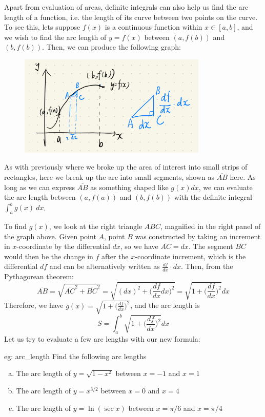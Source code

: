 Apart from evaluation of areas, definite integrals can also help us find the arc length of a function, i.e. the length of its curve between two points on the curve.  To see this, lets suppose $f(x)$ is a continuous function within $x \in [a, b]$, and we wish to find the arc length of $y = f(x)$ between $(a,f(b))$ and $(b, f(b))$.  Then, we can produce the following graph:

\begin{figure}[ht]
    \centering
    \includegraphics[width = 0.8\textwidth]{figures/chap 07/arc_length.png}
\end{figure}

As with previously where we broke up the area of interest into small strips of rectangles, here we break up the arc into small segments, shown as $\overline{AB}$ here.  As long as we can express $\overline{AB}$ as something shaped like $g(x)dx$, we can evaluate the arc length between $(a, f(a))$ and $(b, f(b))$ with the definite integral $\int_a^b g(x)~dx$.  

To find $g(x)$, we look at the right triangle $ABC$, magnified in the right panel of the graph above.  Given point $A$, point $B$ was constructed by taking an increment in $x$-coordinate by the differential $dx$, so we have $\overline{AC} = dx$.  The segment $\overline{BC}$ would then be the change in $f$ after the $x$-coordinate increment, which is the differential $df$ and can be alternatively written as $\frac{df}{dx}\cdot dx$.  Then, from the Pythagorean theorem:
\[\overline{AB} = \sqrt{\overline{AC}^2+\overline{BC}^2} = \sqrt{(dx)^2 + \Big(\frac{df}{dx}dx\Big)^2} = \sqrt{1 + \Big(\frac{df}{dx}\Big)^2}dx\]
Therefore, we have $g(x) = \sqrt{1 + \Big(\frac{df}{dx}\Big)^2}$, and the arc length is
\[S = \int_a^b \sqrt{1 + \Big(\frac{df}{dx}\Big)^2}dx\]
Let us try to evaluate a few arc lengths with our new formula:
\begin{eg}[]{eg: arc_length}
    Find the following arc lengths
    \begin{enumerate}[a)]
        \item The arc length of $y = \sqrt{1-x^2}$ between $x = -1$ and $x = 1$
        \item The arc length of $y = x^{3/2}$ between $x = 0$ and $x = 4$
        \item The arc length of $y = \ln(\sec x)$ between $x = \pi/6$ and $x = \pi/4$
    \end{enumerate}
\end{eg}

